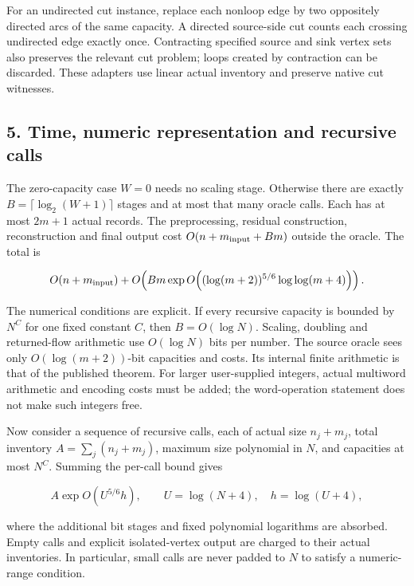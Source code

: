 For an undirected cut instance, replace each nonloop edge by two oppositely directed arcs of the same capacity. A directed source-side cut counts each crossing undirected edge exactly once. Contracting specified source and sink vertex sets also preserves the relevant cut problem; loops created by contraction can be discarded. These adapters use linear actual inventory and preserve native cut witnesses.

\hypertarget{af-bcf24248b3-time-numeric-representation-and-recursive-calls}{%
\subsection{5. Time, numeric representation and recursive calls}\label{af-bcf24248b3-time-numeric-representation-and-recursive-calls}}

The zero-capacity case \(W=0\) needs no scaling stage. Otherwise there are exactly \(B=\lceil\log_2(W+1)\rceil\) stages and at most that many oracle calls. Each has at most \(2m+1\) actual records. The preprocessing, residual construction, reconstruction and final output cost \(O(n+m_{\rm input}+Bm)\) outside the oracle. The total is

\[
O(n+m_{\rm input})+
O\!\left(Bm\exp O\!\left((\log(m+2))^{5/6}
                             \log\log(m+4)\right)\right).
\]

The numerical conditions are explicit. If every recursive capacity is bounded by \(N^C\) for one fixed constant \(C\), then \(B=O(\log N)\). Scaling, doubling and returned-flow arithmetic use \(O(\log N)\) bits per number. The source oracle sees only \(O(\log(m+2))\)-bit capacities and costs. Its internal finite arithmetic is that of the published theorem. For larger user-supplied integers, actual multiword arithmetic and encoding costs must be added; the word-operation statement does not make such integers free.

Now consider a sequence of recursive calls, each of actual size \(n_j+m_j\), total inventory \(A=\sum_j(n_j+m_j)\), maximum size polynomial in \(N\), and capacities at most \(N^C\). Summing the per-call bound gives

\[
A\exp O(U^{5/6}h),\qquad
U=\log(N+4),\quad h=\log(U+4),
\]

where the additional bit stages and fixed polynomial logarithms are absorbed. Empty calls and explicit isolated-vertex output are charged to their actual inventories. In particular, small calls are never padded to \(N\) to satisfy a numeric-range condition.

